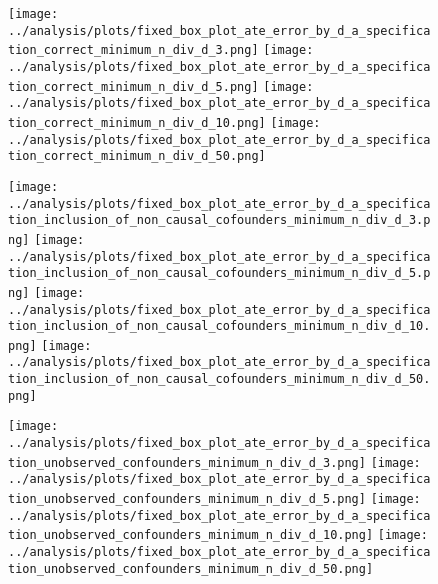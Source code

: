 \documentclass{article}
\numberwithin{equation}{section}
\begin{document}
\begin{figure}[H]
    \centering
    \texttt{[image: ../analysis/plots/fixed\_box\_plot\_ate\_error\_by\_d\_a\_specification\_correct\_minimum\_n\_div\_d\_3.png]}
    \texttt{[image: ../analysis/plots/fixed\_box\_plot\_ate\_error\_by\_d\_a\_specification\_correct\_minimum\_n\_div\_d\_5.png]}
    \texttt{[image: ../analysis/plots/fixed\_box\_plot\_ate\_error\_by\_d\_a\_specification\_correct\_minimum\_n\_div\_d\_10.png]}
    \texttt{[image: ../analysis/plots/fixed\_box\_plot\_ate\_error\_by\_d\_a\_specification\_correct\_minimum\_n\_div\_d\_50.png]}
\end{figure}
\begin{figure}[H]
    \centering
    \texttt{[image: ../analysis/plots/fixed\_box\_plot\_ate\_error\_by\_d\_a\_specification\_inclusion\_of\_non\_causal\_cofounders\_minimum\_n\_div\_d\_3.png]}
    \texttt{[image: ../analysis/plots/fixed\_box\_plot\_ate\_error\_by\_d\_a\_specification\_inclusion\_of\_non\_causal\_cofounders\_minimum\_n\_div\_d\_5.png]}
    \texttt{[image: ../analysis/plots/fixed\_box\_plot\_ate\_error\_by\_d\_a\_specification\_inclusion\_of\_non\_causal\_cofounders\_minimum\_n\_div\_d\_10.png]}
    \texttt{[image: ../analysis/plots/fixed\_box\_plot\_ate\_error\_by\_d\_a\_specification\_inclusion\_of\_non\_causal\_cofounders\_minimum\_n\_div\_d\_50.png]}
\end{figure}
\begin{figure}[H]
    \centering
    \texttt{[image: ../analysis/plots/fixed\_box\_plot\_ate\_error\_by\_d\_a\_specification\_unobserved\_confounders\_minimum\_n\_div\_d\_3.png]}
    \texttt{[image: ../analysis/plots/fixed\_box\_plot\_ate\_error\_by\_d\_a\_specification\_unobserved\_confounders\_minimum\_n\_div\_d\_5.png]}
    \texttt{[image: ../analysis/plots/fixed\_box\_plot\_ate\_error\_by\_d\_a\_specification\_unobserved\_confounders\_minimum\_n\_div\_d\_10.png]}
    \texttt{[image: ../analysis/plots/fixed\_box\_plot\_ate\_error\_by\_d\_a\_specification\_unobserved\_confounders\_minimum\_n\_div\_d\_50.png]}
\end{figure}
\end{document}
